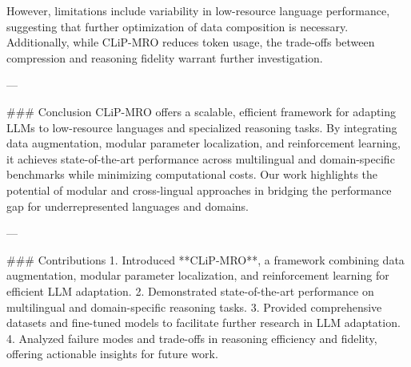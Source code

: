 However, limitations include variability in low-resource language performance, suggesting that further optimization of data composition is necessary. Additionally, while CLiP-MRO reduces token usage, the trade-offs between compression and reasoning fidelity warrant further investigation.

---

### Conclusion
CLiP-MRO offers a scalable, efficient framework for adapting LLMs to low-resource languages and specialized reasoning tasks. By integrating data augmentation, modular parameter localization, and reinforcement learning, it achieves state-of-the-art performance across multilingual and domain-specific benchmarks while minimizing computational costs. Our work highlights the potential of modular and cross-lingual approaches in bridging the performance gap for underrepresented languages and domains.

---

### Contributions
1. Introduced **CLiP-MRO**, a framework combining data augmentation, modular parameter localization, and reinforcement learning for efficient LLM adaptation.
2. Demonstrated state-of-the-art performance on multilingual and domain-specific reasoning tasks.
3. Provided comprehensive datasets and fine-tuned models to facilitate further research in LLM adaptation.
4. Analyzed failure modes and trade-offs in reasoning efficiency and fidelity, offering actionable insights for future work.